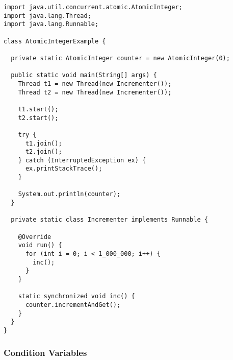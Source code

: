 \begin{lstlisting}[language=MyJava]
import java.util.concurrent.atomic.AtomicInteger;
import java.lang.Thread;
import java.lang.Runnable;

class AtomicIntegerExample {

  private static AtomicInteger counter = new AtomicInteger(0);

  public static void main(String[] args) {
    Thread t1 = new Thread(new Incrementer());
    Thread t2 = new Thread(new Incrementer());

    t1.start();
    t2.start();

    try {
      t1.join();
      t2.join();
    } catch (InterruptedException ex) { 
      ex.printStackTrace(); 
    }

    System.out.println(counter);
  }

  private static class Incrementer implements Runnable {

    @Override
    void run() {
      for (int i = 0; i < 1_000_000; i++) { 
        inc(); 
      }
    }

    static synchronized void inc() {
      counter.incrementAndGet();
    }
  }
}
\end{lstlisting}



\subsubsection*{Condition Variables}


